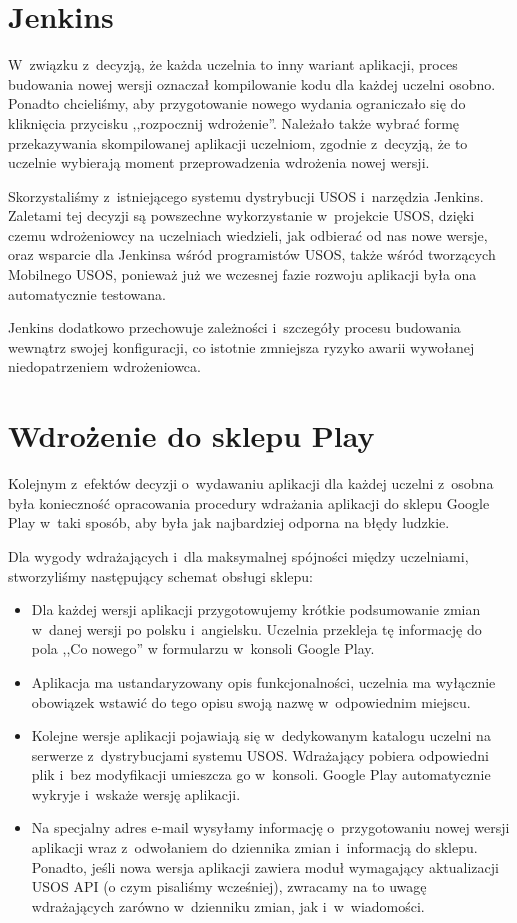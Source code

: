 \documentclass{pracamgr}
\begin{document}
\section{Jenkins}

W~związku z~decyzją, że każda uczelnia to inny wariant aplikacji, proces budowania nowej wersji oznaczał kompilowanie
kodu dla każdej uczelni osobno. Ponadto chcieliśmy, aby przygotowanie nowego wydania ograniczało się do kliknięcia przycisku
,,rozpocznij wdrożenie''. Należało także wybrać formę przekazywania skompilowanej aplikacji uczelniom, zgodnie
z~decyzją, że to uczelnie wybierają moment przeprowadzenia wdrożenia nowej wersji.

Skorzystaliśmy z~istniejącego systemu dystrybucji USOS i~narzędzia Jenkins. Zaletami tej decyzji są powszechne
wykorzystanie w~projekcie USOS, dzięki czemu wdrożeniowcy na uczelniach wiedzieli, jak odbierać od nas nowe wersje,
oraz wsparcie dla Jenkinsa wśród programistów USOS, także wśród tworzących Mobilnego USOS, ponieważ już we wczesnej
fazie rozwoju aplikacji była ona automatycznie testowana.

Jenkins dodatkowo przechowuje zależności i~szczegóły procesu budowania wewnątrz swojej konfiguracji, co istotnie
zmniejsza ryzyko awarii wywołanej niedopatrzeniem wdrożeniowca.

\section{Wdrożenie do sklepu Play}

Kolejnym z~efektów decyzji o~wydawaniu aplikacji dla każdej uczelni z~osobna była
konieczność opracowania procedury wdrażania aplikacji do sklepu Google Play w~taki
sposób, aby była jak najbardziej odporna na błędy ludzkie.

Dla wygody wdrażających i~dla maksymalnej spójności między uczelniami, stworzyliśmy
następujący schemat obsługi sklepu:
\begin{itemize}
	\item Dla każdej wersji aplikacji przygotowujemy krótkie podsumowanie zmian
	w~danej wersji po polsku i~angielsku.
	Uczelnia przekleja tę informację do pola ,,Co nowego'' w formularzu w~konsoli Google Play.
	\item Aplikacja ma ustandaryzowany opis funkcjonalności, uczelnia ma wyłącznie
	obowiązek wstawić do tego opisu swoją nazwę w~odpowiednim miejscu.
	\item Kolejne wersje aplikacji pojawiają się w~dedykowanym katalogu uczelni na
	serwerze z~dystrybucjami systemu USOS. Wdrażający pobiera odpowiedni plik i~bez
	modyfikacji umieszcza go w~konsoli. Google Play automatycznie wykryje i~wskaże
	wersję aplikacji.
	\item Na specjalny adres e-mail wysyłamy informację o~przygotowaniu nowej wersji
	aplikacji wraz z~odwołaniem do dziennika zmian i~informacją do sklepu. Ponadto,
	jeśli nowa wersja aplikacji zawiera moduł wymagający aktualizacji USOS API
	(o czym pisaliśmy wcześniej), zwracamy na to uwagę wdrażających zarówno w~dzienniku
	zmian, jak i~w~wiadomości.
\end{itemize}
\end{document}
